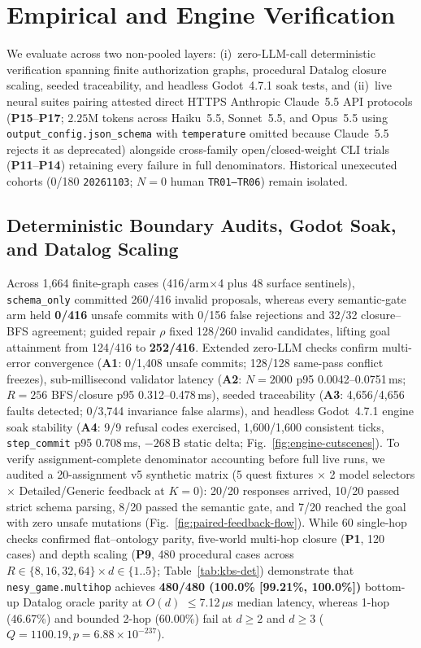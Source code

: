 \section{Empirical and Engine Verification}\label{sec:eval}
We evaluate \system{} across two non-pooled layers: (i)~zero-LLM-call deterministic verification spanning finite authorization graphs, procedural Datalog closure scaling, seeded traceability, and headless Godot~4.7.1 soak tests, and (ii)~live neural suites pairing attested direct HTTPS Anthropic Claude~5.5 API protocols (\textbf{P15}--\textbf{P17}; $2.25\text{M}$ tokens across Haiku~5.5, Sonnet~5.5, and Opus~5.5 using \texttt{output\_config.json\_schema} with \texttt{temperature} omitted because Claude~5.5 rejects it as deprecated) alongside cross-family open/closed-weight CLI trials (\textbf{P11}--\textbf{P14}) retaining every failure in full denominators. Historical unexecuted cohorts (0/180 \texttt{20261103}; $N{=}0$ human \texttt{TR01--TR06}) remain isolated.

\subsection{Deterministic Boundary Audits, Godot Soak, and Datalog Scaling}\label{sec:kbs-det}
Across 1,664 finite-graph cases (416/arm$\times$4 plus 48 surface sentinels), \texttt{schema\_only} committed 260/416 invalid proposals, whereas every semantic-gate arm held \textbf{0/416} unsafe commits with 0/156 false rejections and 32/32 closure--BFS agreement; guided repair $\rho$ fixed 128/260 invalid candidates, lifting goal attainment from 124/416 to \textbf{252/416}. Extended zero-LLM checks confirm multi-error convergence (\textbf{A1}: 0/1,408 unsafe commits; 128/128 same-pass conflict freezes), sub-millisecond validator latency (\textbf{A2}: $N{=}2000$ p95 0.0042--0.0751\,ms; $R{=}256$ BFS/closure p95 0.312--0.478\,ms), seeded traceability (\textbf{A3}: 4,656/4,656 faults detected; 0/3,744 invariance false alarms), and headless Godot~4.7.1 engine soak stability (\textbf{A4}: 9/9 refusal codes exercised, 1,600/1,600 consistent ticks, \texttt{step\_commit} p95 0.708\,ms, $-268$\,B static delta; Fig.~\ref{fig:engine-cutscenes}). To verify assignment-complete denominator accounting before full live runs, we audited a 20-assignment v5 synthetic matrix (5 quest fixtures $\times$ 2 model selectors $\times$ Detailed/Generic feedback at $K{=}0$): 20/20 responses arrived, 10/20 passed strict schema parsing, 8/20 passed the semantic gate, and 7/20 reached the goal with zero unsafe mutations (Fig.~\ref{fig:paired-feedback-flow}). While 60 single-hop checks confirmed flat--ontology parity, five-world multi-hop closure (\textbf{P1}, 120 cases) and depth scaling (\textbf{P9}, 480 procedural cases across $R\in\{8,16,32,64\} \times d\in\{1..5\}$; Table~\ref{tab:kbs-det}) demonstrate that \texttt{nesy\_game.multihop} achieves \textbf{480/480 (100.0\% [99.21\%, 100.0\%])} bottom-up Datalog oracle parity at $O(d)$ $\le$7.12\,$\mu$s median latency, whereas 1-hop (46.67\%) and bounded 2-hop (60.00\%) fail at $d{\ge}2$ and $d{\ge}3$ ($Q{=}1100.19, p{=}6.88{\times}10^{-237}$).

